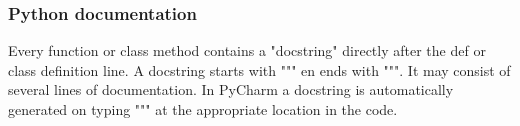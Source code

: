 \subsubsection{Python documentation}

Every function or class method contains a "docstring" directly after the def or class definition line. A docstring starts with """ en ends with """. It may consist of several lines of documentation. In PyCharm a docstring is automatically generated on typing """ at the appropriate location in the code.

\newpage